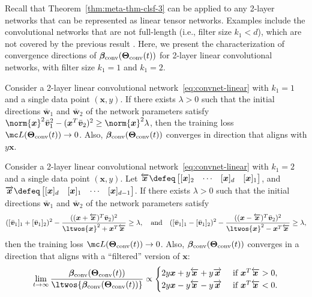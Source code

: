 \documentclass{article} %
\def\vv{{\bm{v}}}
\def\vw{{\bm{w}}}
\def\vx{{\bm{x}}}
\newcommand{\vbeta}{{\bm{\beta}}}
\newcommand{\vbetaconv}{\vbeta_{\rm conv}}
\newcommand{\bTheta}{\bm{\Theta}}
\newcommand{\bThetaconv}{\bTheta_{\rm conv}}
\begin{document}
Recall that Theorem~\ref{thm:meta-thm-clsf-3} can be applied to any 2-layer networks that can be represented as linear tensor networks. Examples include the convolutional networks that are not full-length (i.e., filter size $k_1 < d$), which are not covered by the previous result \citep{gunasekar2018implicit}.
Here, we present the characterization of convergence directions of $\vbetaconv(\bThetaconv(t))$ for 2-layer linear convolutional networks, with filter size $k_1 = 1$ and $k_1 = 2$.
\begin{corollary}
\label{cor:clsf-conv-small}
Consider a 2-layer linear convolutional network~\eqref{eq:convnet-linear} with $k_1 = 1$ and a single data point $(\vx, y)$. If there exists $\lambda > 0$ such that the initial directions $\bar \vw_1$ and $\bar \vw_2$ of the network parameters satisfy $\norm{\vx}^2\bar \vv_1^2 - (\vx^T \bar \vv_2)^2 \geq \norm{\vx}^2 \lambda$, then the training loss $\mc L(\bThetaconv(t)) \to 0$. Also, $\vbetaconv(\bThetaconv(t))$ converges in direction that aligns with $y \vx$.

Consider a 2-layer linear convolutional network~\eqref{eq:convnet-linear} with $k_1 = 2$ and a single data point $(\vx, y)$. Let $\overleftarrow \vx \defeq \begin{bmatrix} [\vx]_2 & \cdots & [\vx]_d & [\vx]_1 \end{bmatrix}$, and $\overrightarrow \vx \defeq \begin{bmatrix} [\vx]_d & [\vx]_1 & \cdots & [\vx]_{d-1} \end{bmatrix}$. If there exists $\lambda > 0$ such that the initial directions $\bar \vw_1$ and $\bar \vw_2$ of the network parameters satisfy 
\begin{align*}
	([\bar \vv_1]_1 + [\bar \vv_1]_2 )^2 - \frac{((\vx+\overleftarrow \vx)^T \bar \vv_2)^2}{\ltwos{\vx}^2 + \vx^T \overleftarrow \vx} \geq \lambda,~~\text{ and }~~
	([\bar \vv_1]_1 - [\bar \vv_1]_2 )^2 - \frac{((\vx-\overleftarrow \vx)^T \bar \vv_2)^2}{\ltwos{\vx}^2 - \vx^T \overleftarrow \vx} \geq \lambda,
\end{align*}
then the training loss $\mc L(\bThetaconv(t)) \to 0$. Also, $\vbetaconv(\bThetaconv(t))$ converges in a direction that aligns with a ``filtered'' version of $\vx$:
\begin{equation*}
	\lim_{t \to \infty} \frac{\vbetaconv(\bThetaconv(t))}{\ltwos{\vbetaconv(\bThetaconv(t))}} \propto
	\begin{cases}
		2y\vx + y\overleftarrow \vx + y\overrightarrow \vx & \text{ if } \vx^T \overleftarrow \vx > 0,\\
		2y\vx - y\overleftarrow \vx - y\overrightarrow \vx & \text{ if } \vx^T \overleftarrow \vx < 0.
	\end{cases}
\end{equation*}
\end{corollary}
\end{document}
